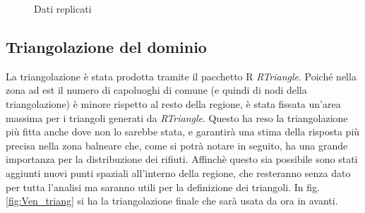 \documentclass[a4paper,11pt,twoside,openright]{book}							%
\begin{document}
\begin{figure}[t]
\centering
{}
\caption{Dati replicati}
\label{fig:Ven_rep}
\end{figure}


\subsection{Triangolazione del dominio}

La triangolazione è stata prodotta tramite il pacchetto R \textit{RTriangle}. Poiché nella zona ad est il numero di capoluoghi di comune (e quindi di nodi della triangolazione) è minore rispetto al resto della regione, è stata fissata un'area massima per i triangoli generati da \textit{RTriangle}. Questo ha reso la triangolazione più fitta anche dove non lo sarebbe stata, e garantirà una stima della risposta più precisa nella zona balneare che, come si potrà notare in seguito, ha una grande importanza per la distribuzione dei rifiuti. Affinchè questo sia possibile sono stati aggiunti nuovi punti spaziali all'interno della regione, che resteranno senza dato per tutta l'analisi ma saranno utili per la definizione dei triangoli. In fig. \ref{fig:Ven_triang} si ha la triangolazione finale che sarà usata da ora in avanti.
\end{document}
